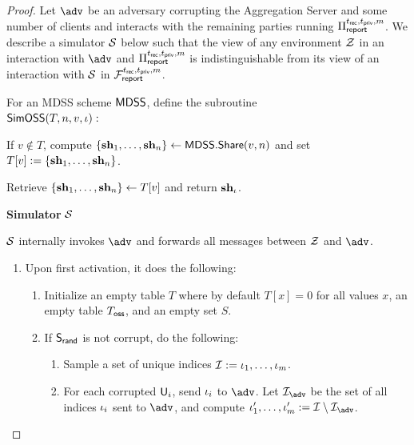 \begin{proof}
	Let $\adv$ be an adversary corrupting the Aggregation Server and some number of clients and interacts with the remaining parties running $\Pi_{\sf report}^{t_{\sf rec},t_{\sf priv}, m}$.
	We describe a simulator $\mathcal{S}$ below such that the view of any environment $\mathcal{Z}$ in an interaction with $\adv$ and $\Pi_{\sf report}^{t_{\sf rec},t_{\sf priv}, m}$ is indistinguishable from its view of an interaction with $\mathcal{S}$ in $\mathcal{F}_{\sf report}^{t_{\sf rec},t_{\sf priv},m}$.


	For an MDSS scheme ${\sf MDSS}$, define the subroutine \\${\sf SimOSS}(T, n, v, \iota):$
		\begin{algenumerate}
		\item If $v \notin T$, compute $\{\mathbf{sh}_1, \dots, \mathbf{sh}_{n}\} \leftarrow {\sf MDSS}.{{\sf Share}}(v, n)$ and set $T[v] := \{\mathbf{sh}_1, \dots, \mathbf{sh}_{n}\}$.
		\item Retrieve $\{\mathbf{sh}_1, \dots, \mathbf{sh}_{n}\} \leftarrow T[v]$ and return $\mathbf{sh}_{\iota}$.
		\end{algenumerate}

		\begin{techbox}
		\begin{center}
		\textbf{Simulator} $\mathcal{S}$
		\end{center}
		\vspace{1em}
	$\mathcal{S}$ internally invokes $\adv$ and forwards all messages between $\mathcal{Z}$ and $\adv$.

		\begin{enumerate}
		\item Upon first activation, it does the following:
		\begin{enumerate}
		\item Initialize an empty table $T$ where by default $T[x] = 0$ for all values $x$, an empty table $T_{\sf oss}$, and an empty set $S$.
		\item If $\mathsf{S}_{\mathsf{rand}}$ is not corrupt, do the following:
		\begin{enumerate}
		\item Sample a set of unique indices $\mathcal{I} := \iota_1, \dots, \iota_{m}$.
		\item For each corrupted $\mathsf{U}_i$, send $\iota_i$ to $\adv$. Let $\indexset_{\adv}$ be the set of all indices $\iota_i$ sent to $\adv$, and compute $\shidx'_1, \dots, \shidx'_m := \indexset \setminus \indexset_{\adv}$.
		\end{enumerate}
		\end{enumerate}


\end{enumerate}
\end{techbox}
\end{proof}

